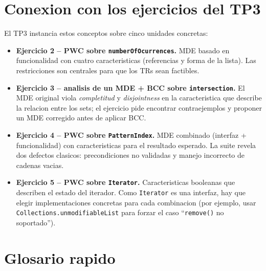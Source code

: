 \documentclass[12pt,a4paper]{article}
\begin{document}
\section{Conexion con los ejercicios del TP3}

El TP3 instancia estos conceptos sobre cinco unidades concretas:

\begin{itemize}
  \item \textbf{Ejercicio 2 -- PWC sobre \texttt{numberOfOcurrences}.} MDE basado en
  funcionalidad con cuatro caracteristicas (referencias y forma de la lista). Las restricciones
  son centrales para que los TRs sean factibles.

  \item \textbf{Ejercicio 3 -- analisis de un MDE + BCC sobre \texttt{intersection}.} El MDE
  original viola \emph{completitud} y \emph{disjointness} en la caracteristica que describe la
  relacion entre los sets; el ejercicio pide encontrar contraejemplos y proponer un MDE corregido
  antes de aplicar BCC.

  \item \textbf{Ejercicio 4 -- PWC sobre \texttt{PatternIndex}.} MDE combinado (interfaz +
  funcionalidad) con caracteristicas para el resultado esperado. La suite revela dos defectos
  clasicos: precondiciones no validadas y manejo incorrecto de cadenas vacias.

  \item \textbf{Ejercicio 5 -- PWC sobre \texttt{Iterator}.} Caracteristicas booleanas que
  describen el estado del iterador. Como \texttt{Iterator} es una interfaz, hay que elegir
  implementaciones concretas para cada combinacion (por ejemplo, usar
  \texttt{Collections.unmodifiableList} para forzar el caso ``\texttt{remove()} no soportado'').
\end{itemize}

\section{Glosario rapido}
\end{document}
